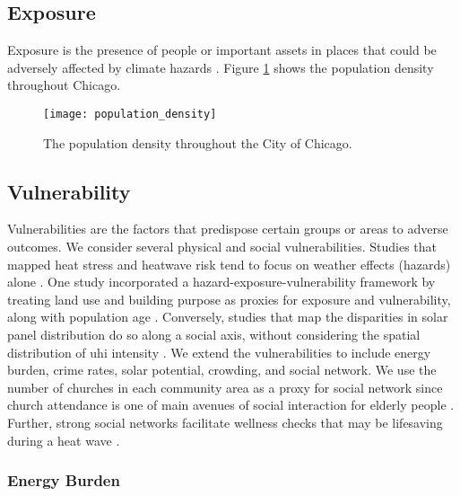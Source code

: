 \subsection{Exposure}

Exposure is the presence of people or important assets in places that could be
adversely affected by climate hazards \cite{viner_understanding_2020}. Figure
\ref{fig:population} shows the population density throughout Chicago.

\begin{figure}[H]
    \begin{center}
      \texttt{[image: population\_density]}
      \caption{The population density throughout the City of Chicago.}
      \label{fig:population}
    \end{center}
\end{figure}

\subsection{Vulnerability}

Vulnerabilities are the factors that predispose certain groups or areas to adverse
outcomes. We consider several physical and social vulnerabilities. Studies that
mapped heat stress and heatwave risk tend to focus on weather effects (hazards)
alone \cite{dahl_killer_2019, kang_heatwave-related_2020,mazdiyasni_heat_2019,
cotlier_extreme_2022}. One study incorporated a hazard-exposure-vulnerability
framework by treating land use and building purpose as proxies for exposure and
vulnerability, along with population age \cite{maragno_mapping_2020}. Conversely,
studies that map the disparities in solar panel distribution do so along a social
axis, without considering the spatial distribution of \ac{uhi} intensity
\cite{reames_distributional_2020}. We extend the vulnerabilities to include
energy burden, crime rates, solar potential, crowding, and social network. We use
the number of churches in each community area as a proxy for social network since
church attendance is one of main avenues of social interaction for elderly people
\cite{klinenberg_heat_2003}. Further, strong social networks facilitate wellness
checks that may be lifesaving during a heat wave \cite{gronlund_racial_2014}.

\subsubsection{Energy Burden}

